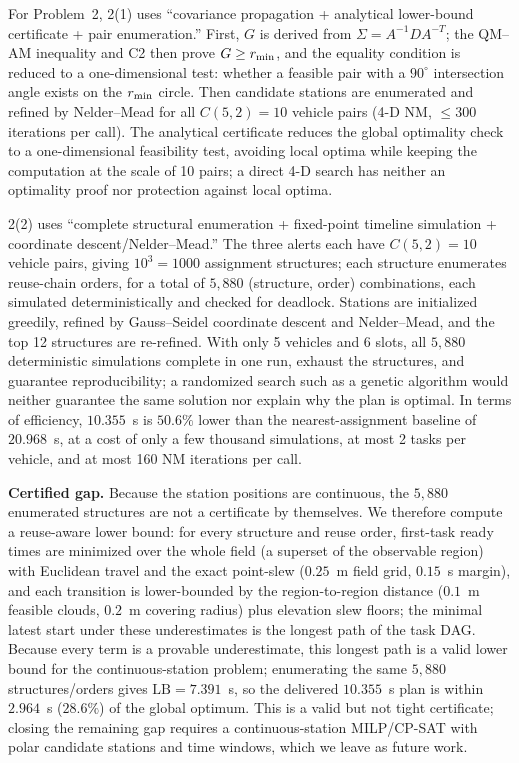 For Problem~2, 2(1) uses ``covariance propagation + analytical lower-bound certificate + pair enumeration.'' First, $G$ is derived from $\Sigma=A^{-1}DA^{-T}$; the QM--AM inequality and C2 then prove $G\ge r_{\min}$, and the equality condition is reduced to a one-dimensional test: whether a feasible pair with a $90^\circ$ intersection angle exists on the $r_{\min}$ circle. Then candidate stations are enumerated and refined by Nelder--Mead for all $C(5,2)=10$ vehicle pairs (4-D NM, $\le300$ iterations per call). The analytical certificate reduces the global optimality check to a one-dimensional feasibility test, avoiding local optima while keeping the computation at the scale of 10 pairs; a direct 4-D search has neither an optimality proof nor protection against local optima.

2(2) uses ``complete structural enumeration + fixed-point timeline simulation + coordinate descent/Nelder--Mead.'' The three alerts each have $C(5,2)=10$ vehicle pairs, giving $10^3=1000$ assignment structures; each structure enumerates reuse-chain orders, for a total of $5{,}880$ (structure, order) combinations, each simulated deterministically and checked for deadlock. Stations are initialized greedily, refined by Gauss--Seidel coordinate descent and Nelder--Mead, and the top 12 structures are re-refined. With only 5 vehicles and 6 slots, all $5{,}880$ deterministic simulations complete in one run, exhaust the structures, and guarantee reproducibility; a randomized search such as a genetic algorithm would neither guarantee the same solution nor explain why the plan is optimal. In terms of efficiency, $10.355$~s is $50.6\%$ lower than the nearest-assignment baseline of $20.968$~s, at a cost of only a few thousand simulations, at most 2 tasks per vehicle, and at most 160 NM iterations per call.

\textbf{Certified gap.} Because the station positions are continuous, the $5{,}880$ enumerated structures are not a certificate by themselves. We therefore compute a reuse-aware lower bound: for every structure and reuse order, first-task ready times are minimized over the whole field (a superset of the observable region) with Euclidean travel and the exact point-slew ($0.25$~m field grid, $0.15$~s margin), and each transition is lower-bounded by the region-to-region distance ($0.1$~m feasible clouds, $0.2$~m covering radius) plus elevation slew floors; the minimal latest start under these underestimates is the longest path of the task DAG. Because every term is a provable underestimate, this longest path is a valid lower bound for the continuous-station problem; enumerating the same $5{,}880$ structures/orders gives $\mathrm{LB}=7.391$~s, so the delivered $10.355$~s plan is within $2.964$~s ($28.6\%$) of the global optimum. This is a valid but not tight certificate; closing the remaining gap requires a continuous-station MILP/CP-SAT with polar candidate stations and time windows, which we leave as future work.

